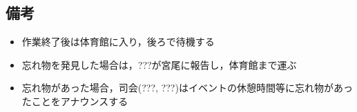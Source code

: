 \subsection{備考}
\begin{itemize}
  \item 作業終了後は体育館に入り，後ろで待機する
  \item 忘れ物を発見した場合は，???が宮尾に報告し，体育館まで運ぶ
  \item 忘れ物があった場合，司会(???, ???)はイベントの休憩時間等に忘れ物があったことをアナウンスする
\end{itemize}

%


